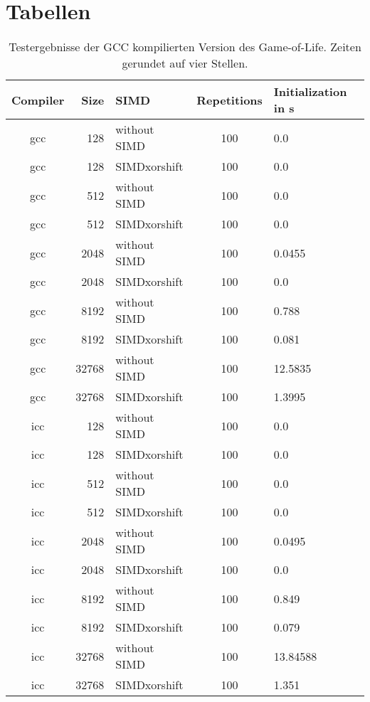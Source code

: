 \documentclass[german,plainarticle,hyperref,utf8]{zihpub}
\begin{document}
	\section{Tabellen} \label{tables}
	\begin{table}[h]
		\centering
			\begin{tabular}{||c r l c l||}
				\hline
				Compiler & Size  & SIMD & Repetitions & Initialization in s \\ [1ex]
				\hline\hline
				gcc & 128   & without SIMD & 100 & 0.0      \\ \hline
				gcc & 128   & SIMDxorshift & 100 & 0.0      \\ \hline
				gcc & 512   & without SIMD & 100 & 0.0      \\ \hline
				gcc & 512   & SIMDxorshift & 100 & 0.0      \\ \hline
				gcc & 2048  & without SIMD & 100 & 0.0455   \\ \hline
				gcc & 2048  & SIMDxorshift & 100 & 0.0      \\ \hline
				gcc & 8192  & without SIMD & 100 & 0.788    \\ \hline
				gcc & 8192  & SIMDxorshift & 100 & 0.081    \\ \hline
				gcc & 32768 & without SIMD & 100 & 12.5835  \\ \hline
				gcc & 32768 & SIMDxorshift & 100 & 1.3995   \\ \hline \hline
				icc & 128   & without SIMD & 100 & 0.0      \\ \hline
				icc & 128   & SIMDxorshift & 100 & 0.0      \\ \hline
				icc & 512   & without SIMD & 100 & 0.0      \\ \hline
				icc & 512   & SIMDxorshift & 100 & 0.0      \\ \hline
				icc & 2048  & without SIMD & 100 & 0.0495   \\ \hline
				icc & 2048  & SIMDxorshift & 100 & 0.0      \\ \hline
				icc & 8192  & without SIMD & 100 & 0.849    \\ \hline
				icc & 8192  & SIMDxorshift & 100 & 0.079    \\ \hline
				icc & 32768 & without SIMD & 100 & 13.84588 \\ \hline
				icc & 32768 & SIMDxorshift & 100 & 1.351    \\ \hline
			\end{tabular}
			\caption{\label{tab:init}Testergebnisse der GCC kompilierten Version des Game-of-Life. Zeiten gerundet auf vier Stellen.}
	\end{table}
\end{document}

